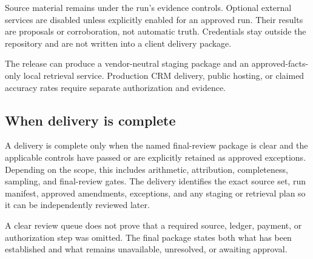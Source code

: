 \documentclass[
]{article}
\begin{document}
Source material remains under the run's evidence controls. Optional
external services are disabled unless explicitly enabled for an approved
run. Their results are proposals or corroboration, not automatic truth.
Credentials stay outside the repository and are not written into a
client delivery package.

The release can produce a vendor-neutral staging package and an
approved-facts-only local retrieval service. Production CRM delivery,
public hosting, or claimed accuracy rates require separate authorization
and evidence.

\subsection{When delivery is complete}\label{when-delivery-is-complete}

A delivery is complete only when the named final-review package is clear
and the applicable controls have passed or are explicitly retained as
approved exceptions. Depending on the scope, this includes arithmetic,
attribution, completeness, sampling, and final-review gates. The
delivery identifies the exact source set, run manifest, approved
amendments, exceptions, and any staging or retrieval plan so it can be
independently reviewed later.

A clear review queue does not prove that a required source, ledger,
payment, or authorization step was omitted. The final package states
both what has been established and what remains unavailable, unresolved,
or awaiting approval.
\end{document}

